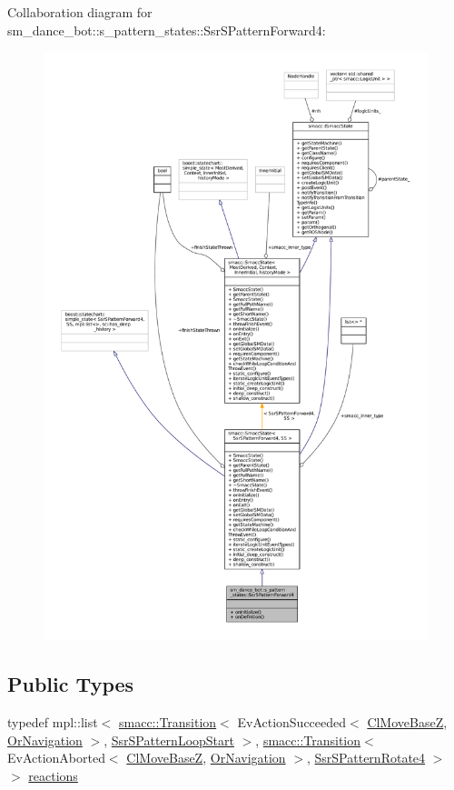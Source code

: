 Collaboration diagram for sm\+\_\+dance\+\_\+bot\+:\+:s\+\_\+pattern\+\_\+states\+:\+:Ssr\+S\+Pattern\+Forward4\+:
\nopagebreak
\begin{figure}[H]
\begin{center}
\leavevmode
\includegraphics[width=350pt]{structsm__dance__bot_1_1s__pattern__states_1_1SsrSPatternForward4__coll__graph}
\end{center}
\end{figure}
\subsection*{Public Types}
\begin{DoxyCompactItemize}
\item 
typedef mpl\+::list$<$ \hyperlink{classsmacc_1_1Transition}{smacc\+::\+Transition}$<$ Ev\+Action\+Succeeded$<$ \hyperlink{classmove__base__z__client_1_1ClMoveBaseZ}{Cl\+Move\+BaseZ}, \hyperlink{classsm__dance__bot_1_1OrNavigation}{Or\+Navigation} $>$, \hyperlink{structsm__dance__bot_1_1s__pattern__states_1_1SsrSPatternLoopStart}{Ssr\+S\+Pattern\+Loop\+Start} $>$, \hyperlink{classsmacc_1_1Transition}{smacc\+::\+Transition}$<$ Ev\+Action\+Aborted$<$ \hyperlink{classmove__base__z__client_1_1ClMoveBaseZ}{Cl\+Move\+BaseZ}, \hyperlink{classsm__dance__bot_1_1OrNavigation}{Or\+Navigation} $>$, \hyperlink{structsm__dance__bot_1_1s__pattern__states_1_1SsrSPatternRotate4}{Ssr\+S\+Pattern\+Rotate4} $>$ $>$ \hyperlink{structsm__dance__bot_1_1s__pattern__states_1_1SsrSPatternForward4_a40359cc1c5b517f1873b017f2ad37dc6}{reactions}
\end{DoxyCompactItemize}
